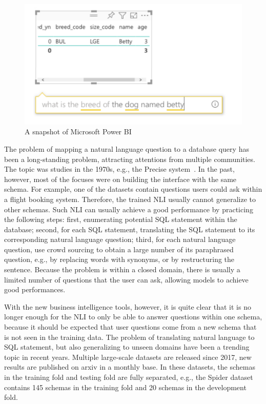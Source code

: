 \begin{figure}[h]
\centering
\includegraphics[width=.5\textwidth]{figure/chapter1/powerbi1_crop}
\caption{A snapshot of Microsoft Power BI\label{ch5:fig1:powerbi1}}
\end{figure}

The problem of mapping a natural language question to a database query has been a long-standing problem, attracting attentions from multiple communities. The topic was studies in the 1970s, e.g., the Precise system~\cite{popescu2003towards}. In the past, however, most of the focuses were on building the interface with the same schema. For example, one of the datasets contain questions users could ask within a flight booking system. Therefore, the trained NLI usually cannot generalize to other schemas. Such NLI can usually achieve a good performance by practicing the following steps: first, enumerating potential SQL statement within the database; second, for each SQL statement, translating the SQL statement to its corresponding natural language question; third, for each natural language question, use crowd sourcing to obtain a large number of its paraphrased question, e.g., by replacing words with synonyms, or by restructuring the sentence. Because the problem is within a closed domain, there is usually a limited number of questions that the user can ask, allowing models to achieve good performances. 

With the new business intelligence tools, however, it is quite clear that it is no longer enough for the NLI to only be able to answer questions within one schema, because it should be expected that user questions come from a new schema that is not seen in the training data. The problem of translating natural language to SQL statement, but also generalizing to unseen domains have been a trending topic in recent years. Multiple large-scale datasets are released since 2017, new results are published on arxiv in a monthly base. In these datasets, the schemas in the training fold and testing fold are fully separated, e.g., the Spider dataset contains 145 schemas in the training fold and 20 schemas in the development fold. 

